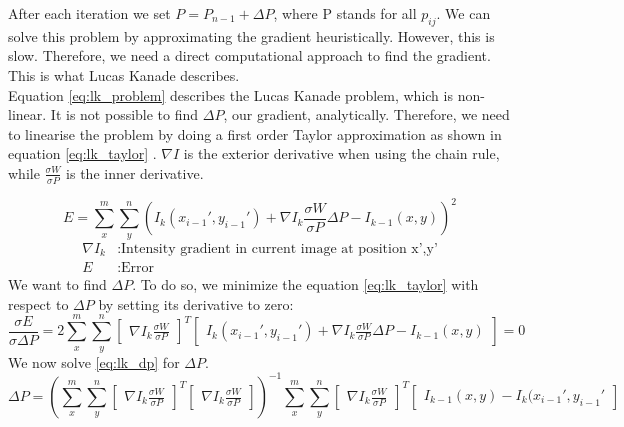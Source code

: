 \documentclass[11pt,a4paper,titlepage,oneside]{report}
\begin{document}
After each iteration we set $P=P_{n-1}+\Delta P$, where P stands for all $p_{ij}$. We can solve this problem by approximating the gradient heuristically. However, this is slow. Therefore, we need a direct computational approach to find the gradient. This is what Lucas Kanade describes.\\
Equation \ref{eq:lk_problem} describes the Lucas Kanade problem, which is non-linear. It is not possible to find $\Delta P$, our gradient, analytically. Therefore, we need to linearise the problem by doing a first order Taylor approximation as shown in equation \ref{eq:lk_taylor} \cite{taylor_series}. $\nabla I$ is the exterior derivative when using the chain rule, while $\frac{\sigma W}{\sigma P}$ is the inner derivative. 

\begin{equation}\label{eq:lk_taylor}
  E=\sum_x^m\sum_y^n(I_{k}(x_{i-1}',y_{i-1}')+\nabla I_{k}\frac{\sigma W}{\sigma P}\Delta P-I_{k-1}(x,y))^2
\end{equation}
\begin{align*}
  \nabla I_k  &: \text{Intensity gradient in current image at position x',y'}\\
  E           &: \text{Error} 
\end{align*}
We want to find $\Delta P$. To do so, we minimize the equation \ref{eq:lk_taylor} with respect to $\Delta P$ by setting its derivative to zero:
\begin{equation}
  \frac{\sigma E}{\sigma \Delta P}=2\sum_x^m\sum_y^n\begin{bmatrix}\nabla I_{k}\frac{\sigma W}{\sigma P}\end{bmatrix}^T\begin{bmatrix}I_{k}(x_{i-1}',y_{i-1}')+\nabla I_{k}\frac{\sigma W}{\sigma P}\Delta P-I_{k-1}(x,y)\end{bmatrix}=0
\end{equation}
We now solve \ref{eq:lk_dp} for $\Delta P$.
\tiny
\begin{equation}\label{eq:lk_dp}
  \Delta P=(\sum_x^m\sum_y^n\begin{bmatrix}\nabla I_{k}\frac{\sigma W}{\sigma P}\end{bmatrix}^T\begin{bmatrix}\nabla I_{k}\frac{\sigma W}{\sigma P}\end{bmatrix})^{-1}
  \sum_x^m\sum_y^n\begin{bmatrix}\nabla I_{k}\frac{\sigma W}{\sigma P}\end{bmatrix}^T\begin{bmatrix}I_{k-1}(x,y) - I_{k}(x_{i-1}',y_{i-1}'\end{bmatrix}
\end{equation}
\normalsize
\end{document}
